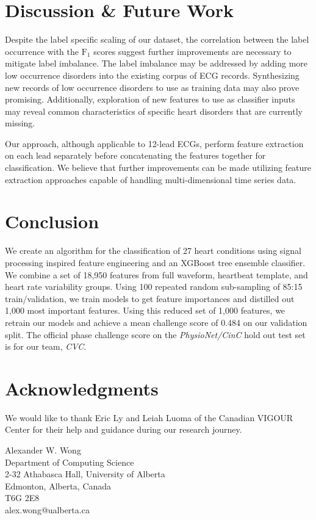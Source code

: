 \documentclass[twocolumn]{cinc}
\begin{document}
\section{Discussion \& Future Work}

Despite the label specific scaling of our dataset, the correlation between the label occurrence with the $\text{F}_1$ scores suggest further improvements are necessary to mitigate label imbalance.
The label imbalance may be addressed by adding more low occurrence disorders into the existing corpus of ECG records.
Synthesizing new records of low occurrence disorders to use as training data may also prove promising.
Additionally, exploration of new features to use as classifier inputs may reveal common characteristics of specific heart disorders that are currently missing.

Our approach, although applicable to 12-lead ECGs, perform feature extraction on each lead separately before concatenating the features together for classification.
We believe that further improvements can be made utilizing feature extraction approaches capable of handling multi-dimensional time series data.

\section{Conclusion}

We create an algorithm for the classification of 27 heart conditions using signal processing inspired feature engineering and an XGBoost tree ensemble classifier.
We combine a set of 18,950 features from full waveform, heartbeat template, and heart rate variability groups.
Using 100 repeated random sub-sampling of 85:15 train/validation, we train models to get feature importances and distilled out 1,000 most important features.
Using this reduced set of 1,000 features, we retrain our models and achieve a mean challenge score of 0.484 on our validation split.
The official phase challenge score on the \emph{PhysioNet/CinC} hold out test set is \officialscore for our team, \emph{CVC}.


\section*{Acknowledgments}
We would like to thank Eric Ly and Leiah Luoma of the Canadian VIGOUR Center for their help and guidance during our research journey.



\begin{correspondence}
Alexander W. Wong\\
Department of Computing Science\\
2-32 Athabasca Hall, University of Alberta\\
Edmonton, Alberta, Canada\\
T6G 2E8\\
alex.wong@ualberta.ca
\end{correspondence}
\end{document}
